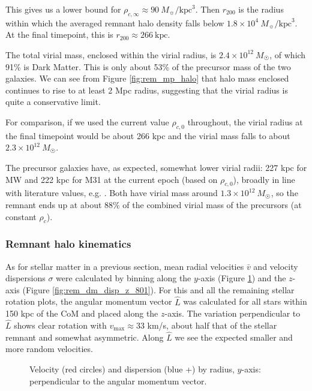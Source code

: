 \documentclass[twocolumn]{aastex63}
\newcommand{\todo}{\color{red}{TODO}\color{black}\hspace{2mm}}
\begin{document}
This gives us a lower bound for $\rho_{c,\infty} \approx 90\ M_\sun/\text{kpc}^3$. Then $r_{200}$ is the radius within which the averaged remnant halo density falls below $1.8 \times 10^4\ M_\sun/\text{kpc}^3$. At the final timepoint, this is $r_{200} \approx 266\ \text{kpc}$.

The total virial mass, enclosed within the virial radius, is $2.4 \times 10^{12}\ M_\Sun$, of which 91\% is Dark Matter. This is only about 53\% of the precursor mass of the two galaxies. We can see from Figure \ref{fig:rem_mp_halo} that halo mass enclosed continues to rise to at least 2 Mpc radius, suggesting that the virial radius is quite a conservative limit.

For comparison, if we used the current value $\rho_{c,0}$ throughout, the virial radius at the final timepoint would be about 266 kpc and the virial mass falls to about $2.3 \times 10^{12}\ M_\Sun$. 

The precursor galaxies have, as expected, somewhat lower virial radii: 227 kpc for MW and 222 kpc for M31 at the current epoch (based on $\rho_{c,0}$), broadly in line with literature values, e.g. \citep{dehnen_velocity_2006}. Both have virial mass around $1.3 \times 10^{12}\ M_\Sun$, so the remnant ends up at about 88\% of the combined virial mass of the precursors (at constant $\rho_c$).

\todo{Some more discussion would be useful!}


\subsubsection{Remnant halo kinematics}

As for stellar matter in a previous section, mean radial velocities $\bar{v}$ and velocity dispersions $\sigma$ were calculated by binning along the $y$-axis (Figure \ref{fig:rem_dm_disp_y_801}) and the $z$-axis (Figure \ref{fig:rem_dm_disp_z_801}). For this and all the remaining stellar rotation plots, the angular momentum vector $\hat{L}$ was calculated for all stars within 150 kpc of the CoM and placed along the $z$-axis. The variation perpendicular to $\hat{L}$ shows clear rotation with $v_{\text{max}} \approx 33$ km/s, about half that of the stellar remnant and somewhat asymmetric. Along $\hat{L}$ we see the expected smaller and more random velocities.

\begin{figure}[htb!]
	\caption{Velocity (red circles) and dispersion (blue +) by radius, $y$-axis: perpendicular to the angular momentum vector.
		\label{fig:rem_dm_disp_y_801}}
\end{figure}
\end{document}
